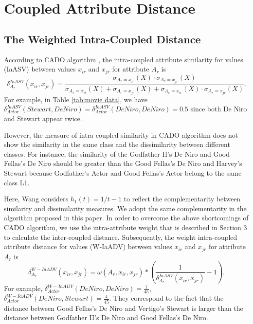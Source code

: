 \documentclass[review]{elsarticle}
\begin{document}
\section{Coupled Attribute Distance}
\subsection{The Weighted Intra-Coupled Distance}
According to CADO algorithm \cite{Wang2015Coupled}, the intra-coupled attribute similarity for values (IaASV) between values $x_{ir}$ and $x_{jr}$ for attribute $A_r$ is
\begin{equation}
\delta_{A_r}^{IaASV}(x_{ir},x_{jr}) = \frac{\sigma_{A_r = x_{ir}}(X) \cdot \sigma_{A_r = x_{jr}}(X)}{\sigma_{A_r = x_{ir}}(X) + \sigma_{A_r = x_{jr}}(X) + \sigma_{A_r = x_{ir}}(X) \cdot \sigma_{A_r = x_{jr}}(X)}.
\label{equ15}
\end{equation}
For example, in Table \ref{tab:movie data}, we have $\delta_{Actor}^{IaASV}(Stewart,De Niro) = \delta_{Actor}^{IaASV}(De Niro,De Niro) = 0.5$ since both De Niro and Stewart appear twice.

However, the measure of intra-coupled similarity in CADO algorithm does not show the similarity in the same class and the dissimilarity between different classes. For instance, the similarity of the Godfather II's De Niro and Good Fellas's De Niro should be greater than the Good Fellas's De Niro and Harvey's Stewart because Godfather's Actor and Good Fellas's Actor belong to the same class L1.

Here, Wang considers $h_1(t) = 1/t - 1$ to reflect the complementarity between similarity and dissimilarity measures. We adopt the same complementarity in the algorithm proposed in this paper. In order to overcome the above shortcomings of CADO algorithm, we use the intra-attribute weight that is described in Section 3 to calculate the inter-coupled distance. Subsequently, the weight intra-coupled attribute distance for values (W-IaADV) between values $x_{ir}$ and $x_{jr}$ for attribute $A_r$ is
\begin{equation}
\label{equ16}
\delta_{A_r}^{W-IaADV}(x_{ir},x_{jr}) = \omega(A_r,x_{ir},x_{jr}) * (\frac{1}{\delta_{A_r}^{IaASV}(x_{ir},x_{jr})} - 1).
\end{equation}
For example, $\delta_{Actor}^{W-IaADV}(De Niro,De Niro) = \frac{1}{45}$, $\delta_{Actor}^{W-IaADV}(De Niro,Stewart) = \frac{4}{45}$. They correspond to the fact that the distance between Good Fellas's De Niro and Vertigo's Stewart is larger than the distance between Godfather II's De Niro and Good Fellas's De Niro.
\end{document}
